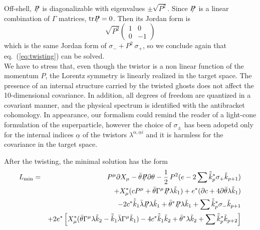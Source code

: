 \documentclass[a4paper,12pt]{article}
\begin{document}
Off-shell,  $\SL{P}$ is diagonalizable with eigenvalues $\pm
\sqrt{P^2}$. Since $\SL{P}$ is a linear combination of
$\Gamma$ matrices, $\textrm{tr} \SL{P} =0$. 
Then its Jordan form is  
\begin{equation} 
\sqrt{P^2} \left( \begin{array}{cc} 1 &0 \\ 0 & -1 \end{array} \right)
\end{equation}
which is the same Jordan form of $\sigma_- + P^2~ \sigma_+$, so 
we conclude again that eq.~(\ref{eq:twisting}) can be solved. \\
We have to stress that, even though the twistor is a non linear function 
of the momentum $P$, the Lorentz symmetry is linearly realized in the target space. 
The presence of an internal structure carried by the twisted ghosts does not affect the 
10-dimensional covariance. In addition, all degrees of freedom are 
quantized in a covariant manner, and the physical spectrum is identified 
with the antibracket cohomology.  In appearance, our formalism could remind the reader 
of a light-cone formulation of the superparticle, however the choice of $\sigma_\pm$ 
has been adopetd only for the internal indices $\underline{\alpha}$ of the twistors 
$\lambda^{\alpha, \underline{\alpha} i}$ and it is harmless for the covariance in the 
target space. 

After the twisting, the minimal solution has the form
\begin{eqnarray}
 L_{\rm min} & = & P^\mu \partial X_\mu - \bar\theta \SL{P} \partial\theta -{1
   \over 2}\,  
   P^2 (e -2 \sum \tilde {\bar k}_p^* \sigma_+ \tilde k_{p+1})  \nonumber \\
 && + X_\mu ^* (c P^\mu + \bar \theta \Gamma^\mu \SL{P} \lambda \tilde 
 k_1 ) + e^*
 (\partial c + 4 \partial \bar \theta \lambda \tilde k_1 ) \nonumber \\
&& -2 c^* \tilde {\bar k}_1 \bar\lambda \SL{P} \lambda \tilde k_1 +
\bar\theta^* \SL{P} \lambda \tilde k_1 + \sum  \tilde {
   \bar k}_p^* \sigma_- \tilde k_{p+1} \nonumber \\
&& + 2 e^* \left[ X_\mu^*(\bar\theta \Gamma^\mu \lambda \tilde k_2 -
  \bar {\tilde k}_1 \bar\lambda 
  \Gamma^\mu \tilde k_1) -4 c^* \tilde {\bar k}_1 \tilde k_2 + \bar
  \theta^* \lambda \tilde k_2 + \sum \tilde{\bar k}_p^* \tilde k_{p+2} \right]
\end{eqnarray}
\end{document}
